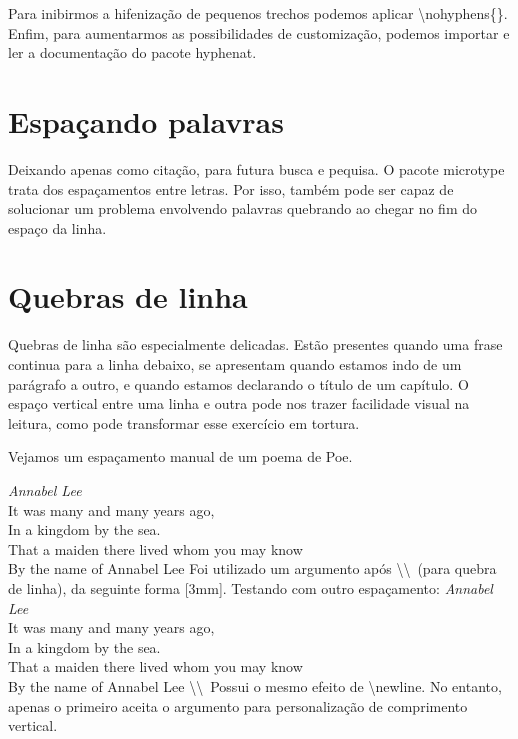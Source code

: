 Para inibirmos a hifenização de pequenos trechos podemos aplicar \textbackslash nohyphens\{\}.
Enfim, para aumentarmos as possibilidades de customização, podemos importar e ler a documentação do pacote hyphenat.

\section{Espaçando palavras}
Deixando apenas como citação, para futura busca e pequisa.
O pacote microtype trata dos espaçamentos entre letras.
Por isso, também pode ser capaz de solucionar um problema envolvendo palavras quebrando ao chegar no fim do espaço da linha.

\section{Quebras de linha}
Quebras de linha são especialmente delicadas.
Estão presentes quando uma frase continua para a linha debaixo,
se apresentam quando estamos indo de um parágrafo a outro,
e quando estamos declarando o título de um capítulo.
O espaço vertical entre uma linha e outra pode nos trazer facilidade visual na leitura,
como pode transformar esse exercício em tortura.

Vejamos um espaçamento manual de um poema de Poe.
\newline

\emph{Annabel Lee} \\[3mm]
It was many and many years ago, \\
In a kingdom by the sea. \\
That a maiden there lived whom you may know \\
By the name of Annabel Lee
\newline
\newline
Foi utilizado um argumento após \textbackslash \textbackslash\ (para quebra de linha), da seguinte forma [3mm].
Testando com outro espaçamento:\newline
\newline
\emph{Annabel Lee} \\[5mm]
It was many and many years ago, \\[3mm]
In a kingdom by the sea. \\[10mm]
That a maiden there lived whom you may know \\[15mm]
By the name of Annabel Lee
\newline
\newline
\textbackslash \textbackslash\ Possui o mesmo efeito de \textbackslash newline.
No entanto, apenas o primeiro aceita o argumento para personalização de comprimento vertical.

